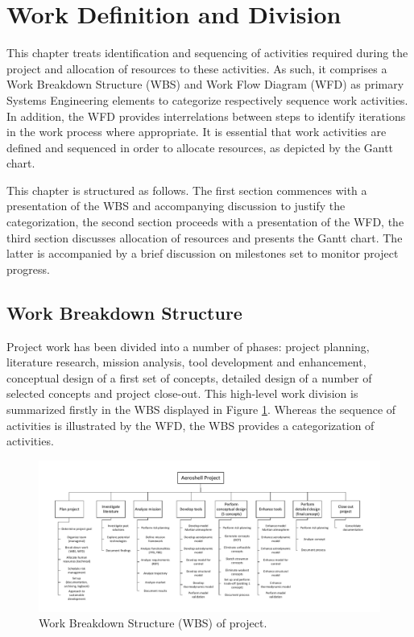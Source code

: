 \section{Work Definition and Division}
This chapter treats identification and sequencing of activities required during the project and allocation of resources to these activities. As such, it comprises a Work Breakdown Structure (WBS) and Work Flow Diagram (WFD) as primary Systems Engineering elements to categorize respectively sequence work activities. In addition, the WFD provides interrelations between steps to identify iterations in the work process where appropriate. It is essential that work activities are defined and sequenced in order to allocate resources, as depicted by the Gantt chart.

This chapter is structured as follows. The first section commences with a presentation of the WBS and accompanying discussion to justify the categorization, the second section proceeds with a presentation of the WFD, the third section discusses allocation of resources and presents the Gantt chart. The latter is accompanied by a brief discussion on milestones set to monitor project progress.

\subsection{Work Breakdown Structure}\label{sec:WBS}
Project work has been divided into a number of phases: project planning, literature research, mission analysis, tool development and enhancement, conceptual design of a first set of concepts, detailed design of a number of selected concepts and project close-out. This high-level work division is summarized firstly in the WBS displayed in Figure \ref{fig:wbs}. Whereas the sequence of activities is illustrated by the WFD, the WBS provides a categorization of activities. 

\begin{figure}
    \includegraphics[scale=0.8]{Figure/WBS.pdf}
    \caption{Work Breakdown Structure (WBS) of project.}
    \label{fig:wbs}
\end{figure}

